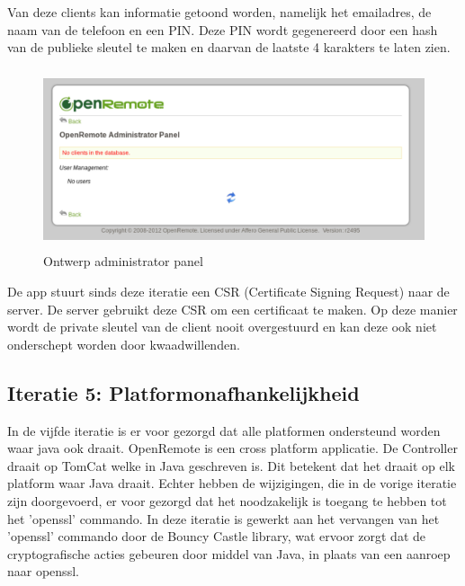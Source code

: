 \documentclass[]{article}
\begin{document}
Van deze clients kan informatie getoond worden, namelijk het emailadres,
de naam van de telefoon en een PIN. Deze PIN wordt gegenereerd door een
hash van de publieke sleutel te maken en daarvan de laatste 4 karakters te
laten zien.

\begin{figure}[h!]
  \centering
    \includegraphics[height=150pt,keepaspectratio]{adminv1.pdf}
  \caption{Ontwerp administrator panel}
  \label{adminv1}
\end{figure}

De app stuurt sinds deze iteratie een CSR (Certificate Signing Request) naar de server. De server
gebruikt deze CSR om een certificaat te maken. Op deze manier wordt de private
sleutel van de client nooit overgestuurd en kan deze ook niet onderschept
worden door kwaadwillenden.

\subsection{Iteratie 5: Platformonafhankelijkheid}

In de vijfde iteratie is er voor gezorgd dat alle platformen ondersteund worden
waar java ook draait.
OpenRemote is een cross platform applicatie. De Controller draait op TomCat
welke in Java geschreven is. Dit betekent dat het draait op elk platform waar
Java draait. Echter hebben de wijzigingen, die in de vorige iteratie zijn
doorgevoerd, er voor gezorgd dat het noodzakelijk is toegang te hebben tot
het 'openssl' commando. In deze iteratie is gewerkt aan het vervangen van het
'openssl' commando door de Bouncy Castle library, wat ervoor zorgt dat de
cryptografische acties gebeuren door middel van Java, in plaats van een aanroep
naar openssl. 
\end{document}
